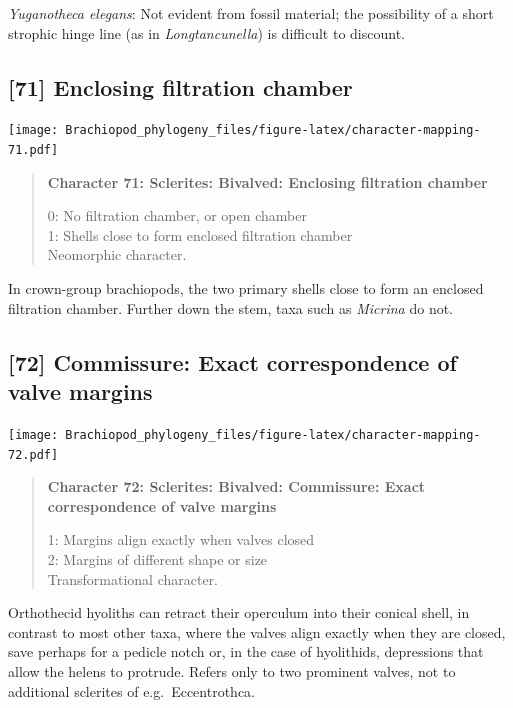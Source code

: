 \documentclass[openany]{book}
\begin{document}
\hypertarget{Yuganotheca_elegans-coding-70}{}
\emph{Yuganotheca elegans}: Not evident from fossil material; the
possibility of a short strophic hinge line (as in \emph{Longtancunella})
is difficult to discount.

\subsection*{{[}71{]} Enclosing filtration
chamber}\label{enclosing-filtration-chamber}

\texttt{[image: Brachiopod\_phylogeny\_files/figure-latex/character-mapping-71.pdf]}

\begin{quote}
\textbf{Character 71: Sclerites: Bivalved: Enclosing filtration chamber}

0: No filtration chamber, or open chamber\\
1: Shells close to form enclosed filtration chamber\\
Neomorphic character.
\end{quote}

In crown-group brachiopods, the two primary shells close to form an
enclosed filtration chamber. Further down the stem, taxa such as
\emph{Micrina} do not.

\subsection*{{[}72{]} Commissure: Exact correspondence of valve
margins}\label{commissure-exact-correspondence-of-valve-margins}

\texttt{[image: Brachiopod\_phylogeny\_files/figure-latex/character-mapping-72.pdf]}

\begin{quote}
\textbf{Character 72: Sclerites: Bivalved: Commissure: Exact
correspondence of valve margins}

1: Margins align exactly when valves closed\\
2: Margins of different shape or size\\
Transformational character.
\end{quote}

Orthothecid hyoliths can retract their operculum into their conical
shell, in contrast to most other taxa, where the valves align exactly
when they are closed, save perhaps for a pedicle notch or, in the case
of hyolithids, depressions that allow the helens to protrude. Refers
only to two prominent valves, not to additional sclerites of
e.g.~Eccentrothca.
\end{document}
